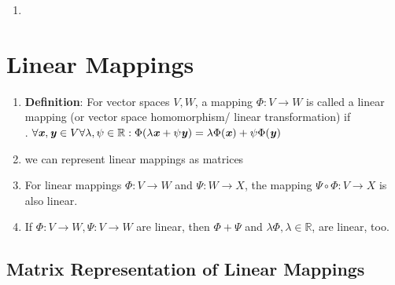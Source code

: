 \begin{enumerate}
\begin{enumerate}
        \item 
    \end{enumerate}
\end{enumerate}























\section{Linear Mappings}

\begin{enumerate}
    \item \textbf{Definition}: For vector spaces $V, W$, a mapping $\Phi : V \to W$ is called a linear mapping (or vector space homomorphism/ linear transformation) if
    \hfill \cite{mfml/book/mml/Deisenroth-Faisal-Ong}
    \\
    .\hfill
    $
        \forall \text{\textbf{\textit{x}}}, \text{\textbf{\textit{y}}} \in V \forall \lambda , \psi  \in \mathbb{R} : 
        \Phi(\lambda \text{\textbf{\textit{x}}} + \psi \text{\textbf{\textit{y}}}) = \lambda \Phi(\text{\textbf{\textit{x}}}) + \psi \Phi(\text{\textbf{\textit{y}}})
    $
    \hfill \cite{mfml/book/mml/Deisenroth-Faisal-Ong}

    \item we can represent linear mappings as matrices
    \hfill \cite{mfml/book/mml/Deisenroth-Faisal-Ong}

    \item For linear mappings $\Phi : V \to W$ and $\Psi : W \to X$, the mapping $\Psi \circ \Phi : V \to X$ is also linear.
    \hfill \cite{mfml/book/mml/Deisenroth-Faisal-Ong}

    \item If $\Phi : V \to W, \Psi : V \to W$ are linear, then $\Phi + \Psi$ and $\lambda\Phi, \lambda \in \mathbb{R}$, are linear, too.
    \hfill \cite{mfml/book/mml/Deisenroth-Faisal-Ong}
\end{enumerate}



\subsection{Matrix Representation of Linear Mappings}

